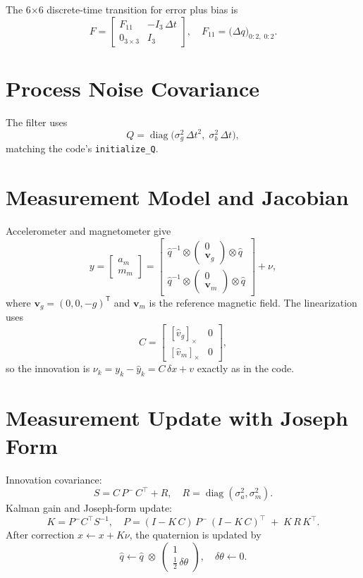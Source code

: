 \documentclass[12pt,letterpaper]{article}
\begin{document}
The 6×6 discrete‐time transition for error plus bias is
\[
F =
\begin{bmatrix}
F_{11} & -I_3\,\Delta t\\[3pt]
0_{3\times3} & I_3
\end{bmatrix},
\quad
F_{11} = \bigl(\Delta q\bigr)_{0\!:\!2,\;0\!:\!2}.
\]

\section{Process Noise Covariance}
The filter uses
\[
Q = \operatorname{diag}\bigl(\sigma_g^2\,\Delta t^2,\;\sigma_b^2\,\Delta t\bigr),
\]
matching the code’s \texttt{initialize\_Q}.

\section{Measurement Model and Jacobian}
Accelerometer and magnetometer give
\[
y = \begin{bmatrix}a_m\\ m_m\end{bmatrix}
=
\begin{bmatrix}
\hat q^{-1}\otimes
\begin{pmatrix}0 \\ \mathbf v_g\end{pmatrix}
\otimes\hat q
\\[8pt]
\hat q^{-1}\otimes
\begin{pmatrix}0 \\ \mathbf v_m\end{pmatrix}
\otimes\hat q
\end{bmatrix}
+ \nu,
\]
where $\mathbf v_g=(0,0,-g)^\mathsf{T}$ and $\mathbf v_m$ is the reference magnetic field.  The linearization uses
\[
C =
\begin{bmatrix}
[\hat v_g]_\times & 0\\[3pt]
[\hat v_m]_\times & 0
\end{bmatrix},
\]
so the innovation is $\nu_k=y_k-\hat y_k=C\,\delta x+v$ exactly as in the code.

\section{Measurement Update with Joseph Form}
Innovation covariance:
\[
S = C\,P^-\,C^\top + R,
\quad R=\operatorname{diag}(\sigma_a^2,\sigma_m^2).
\]
Kalman gain and Joseph‐form update:
\[
K = P^-C^\top S^{-1},\quad
P = (I - K\,C)\,P^-\,(I - K\,C)^\top \;+\; K\,R\,K^\top.
\]
After correction $x\leftarrow x + K\nu$, the quaternion is updated by
\[
\hat q \leftarrow \hat q \;\otimes\;
\begin{pmatrix}1\\ \tfrac12\,\delta\theta\end{pmatrix},
\quad
\delta\theta\leftarrow0.
\]
\end{document}
